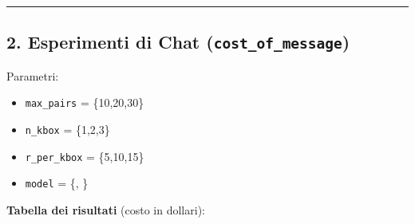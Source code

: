 \documentclass[a4paper,12pt]{article}
\begin{document}
\bigskip

\hrule
\subsection*{2. Esperimenti di Chat (\texttt{cost\_of\_message})}

Parametri:
\begin{itemize}
 \item \texttt{max\_pairs} = \{10,20,30\}
 \item \texttt{n\_kbox} = \{1,2,3\}
 \item \texttt{r\_per\_kbox} = \{5,10,15\}
 \item \texttt{model} = \{, \}
\end{itemize}

\noindent
\textbf{Tabella dei risultati} (costo in dollari):
\end{document}
